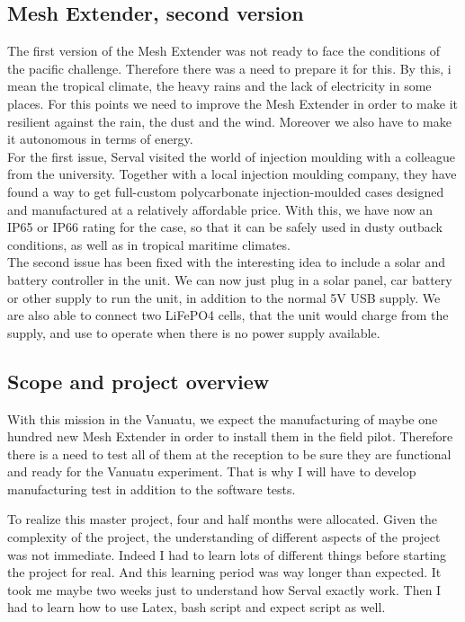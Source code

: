 \subsection{Mesh Extender, second version}
The first version of the Mesh Extender was not ready to face the conditions of the pacific challenge. Therefore there was a need to prepare it for this. By this, i mean the tropical climate, the heavy rains and the lack of electricity in some places. For this points we need to improve the Mesh Extender in order to make it resilient against the rain, the dust and the wind. Moreover we also have to make it autonomous in terms of energy. \\
For the first issue, Serval visited the world of injection moulding with a colleague from the university. Together with a local injection moulding company, they have found a way to get full-custom polycarbonate injection-moulded cases designed and manufactured at a relatively affordable price. With this, we have now an IP65 or IP66 rating for the case, so that it can be safely used in dusty outback conditions, as well as in tropical maritime climates.\\
The second issue has been fixed with the interesting idea to include a solar and battery controller in the unit. We can now just plug in a solar panel, car battery or other supply to run the unit, in addition to the normal 5V USB supply.  We are also able to connect two LiFePO4 cells, that the unit would charge from the supply, and use to operate when there is no power supply available. 

\subsection{Scope and project overview}
With this mission in the Vanuatu, we expect the manufacturing of maybe one hundred new Mesh Extender in order to install them in the field pilot. Therefore there is a need to test all of them at the reception to be sure they are functional and ready for the Vanuatu experiment. That is why I will have to develop manufacturing test in addition to the software tests. 
\par
To realize this master project, four and half months were allocated. Given the complexity of the project, the understanding of different aspects of the project was not immediate. Indeed I had to learn lots of different things before starting the project for real. And this learning period was way longer than expected. It took me maybe two weeks just to understand how Serval exactly work. Then I had to learn how to use Latex, bash script and expect script as well. 